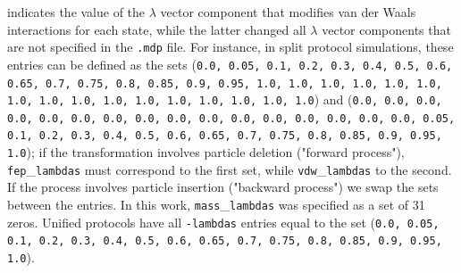\documentclass[journal=jctcce,manuscript=article]{achemso}
\newcommand{\inpopt}[1]{\texttt{#1}}
\begin{document}
indicates the value of the $\lambda$ vector component that modifies van der Waals interactions for each state,
while the latter changed all $\lambda$ vector components that are not specified in the \inpopt{.mdp} file.
For instance, in split protocol simulations, these entries can be defined as the sets 
(\inpopt{0.0, 0.05, 0.1, 0.2, 0.3, 0.4, 0.5, 0.6, 0.65, 0.7, 0.75, 0.8, 0.85, 0.9, 0.95, 1.0, 1.0, 1.0, 1.0, 1.0, 1.0, 
1.0, 1.0, 1.0,  1.0, 1.0,  1.0, 1.0, 1.0, 1.0, 1.0}) and (\inpopt{0.0, 0.0, 0.0, 0.0, 0.0, 0.0, 0.0, 0.0, 0.0, 0.0, 0.0, 
0.0, 0.0, 0.0, 0.0, 0.0, 0.05, 0.1, 0.2, 0.3, 0.4, 0.5, 0.6, 0.65, 0.7, 0.75, 
0.8, 0.85, 0.9, 0.95, 1.0}); if the 
transformation involves particle deletion ("forward process"), \inpopt{fep}\_\inpopt{lambdas} must correspond to 
the first set, while \inpopt{vdw}\_\inpopt{lambdas} to the second. If the process involves particle insertion ("backward 
process") we swap the sets between the entries. In this work, \inpopt{mass}\_\inpopt{lambdas} was specified as
a set of 31 zeros. Unified protocols have all \inpopt{-lambdas} entries equal to the set (\inpopt{0.0, 0.05, 
0.1, 0.2, 0.3, 0.4, 0.5, 0.6, 0.65, 0.7, 0.75, 0.8, 0.85, 0.9, 0.95, 1.0}).


\end{document}
